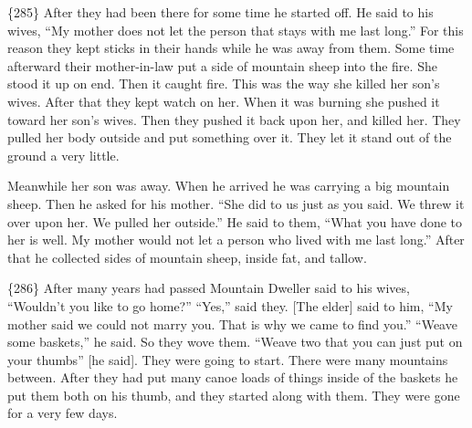 \{285\}
After they had been there for some time he started off.
He said to his wives,
“My mother does not let the person that stays with me last long.”
For this reason they kept sticks in their hands while he was away from them.
Some time afterward their mother-in-law put a side of mountain sheep into the fire.
She stood it up on end.
Then it caught fire.
This was the way she killed her son’s wives.
After that they kept watch on her.
When it was burning she pushed it toward her son’s wives.
Then they pushed it back upon her, and killed her.
They pulled her body outside and put something over it.
They let it stand out of the ground a very little.

Meanwhile her son was away.
When he arrived he was carrying a big mountain sheep.
Then he asked for his mother.
“She did to us just as you said.
We threw it over upon her.
We pulled her outside.”
He said to them,
“What you have done to her is well.
My mother would not let a person who lived with me last long.”
After that he collected sides of mountain sheep, inside fat, and tallow.

\{286\}
After many years had passed Mountain Dweller said to his wives,
“Wouldn’t you like to go home?”
“Yes,” said they.
{}[The elder] said to him,
“My mother said we could not marry you.
That is why we came to find you.”
“Weave some baskets,”
he said.
So they wove them.
“Weave two that you can just put on your thumbs” [he said].
They were going to start.
There were many mountains between.
After they had put many canoe loads of things inside of the baskets he put them both on his thumb, and they started along with them.
They were gone for a very few days.

